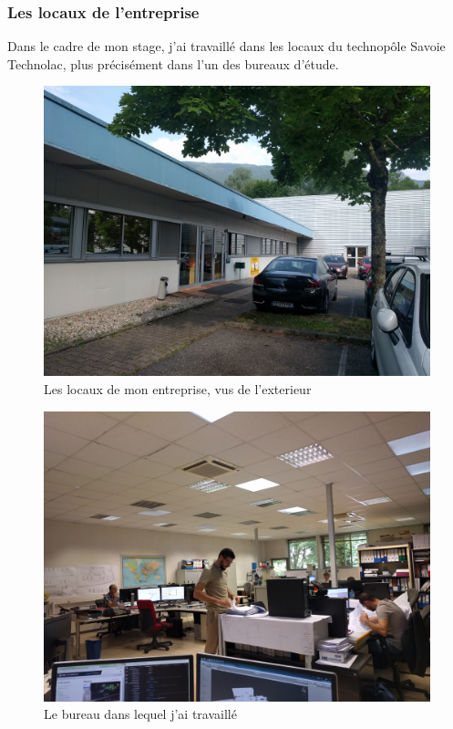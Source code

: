 \documentclass[a4paper]{article}
\begin{document}
    \subsubsection{Les locaux de l'entreprise}

    Dans le cadre de mon stage, j’ai travaillé dans les locaux du technopôle Savoie Technolac, plus précisément dans l'un des bureaux d’étude. \\

    \begin{figure}[H]
        \centering
        \includegraphics[scale=0.065]{img/imgLocaux}
        \caption{Les locaux de mon entreprise, vus de l'exterieur}
    \end{figure}
    \begin{figure}[H]
        \centering
        \includegraphics[scale=0.065]{img/bureauEtude}
        \caption{Le bureau dans lequel j'ai travaillé}
    \end{figure}
\end{document}
